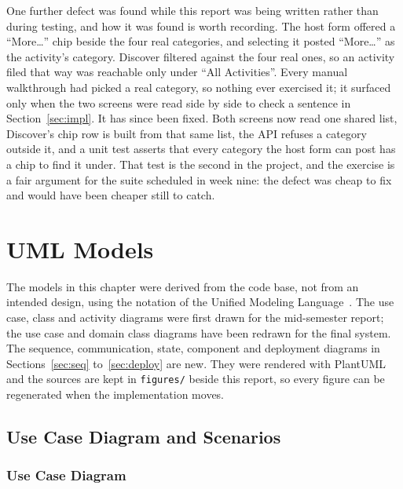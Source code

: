 \documentclass{tietreport}
\begin{document}
One further defect was found while this report was being written rather than during
testing, and how it was found is worth recording. The host form offered a
``More\ldots'' chip beside the four real categories, and selecting it posted
``More\ldots'' as the activity's category. Discover filtered against the four real
ones, so an activity filed that way was reachable only under ``All Activities''. Every
manual walkthrough had picked a real category, so nothing ever exercised it; it surfaced
only when the two screens were read side by side to check a sentence in
Section~\ref{sec:impl}. It has since been fixed. Both screens now read one shared list,
Discover's chip row is built from that same list, the API refuses a category outside it,
and a unit test asserts that every category the host form can post has a chip to find it
under. That test is the second in the project, and the exercise is a fair argument for
the suite scheduled in week nine: the defect was cheap to fix and would have been cheaper
still to catch.







\chapter{UML Models}
\label{ch:uml}

The models in this chapter were derived from the code base, not from an intended design,
using the notation of the Unified Modeling Language~\cite{booch2005,fowler2004}. The use
case, class and activity diagrams were first drawn for the mid-semester report; the use case
and domain class diagrams have been redrawn for the final system. The sequence,
communication, state, component and deployment diagrams in
Sections~\ref{sec:seq} to~\ref{sec:deploy} are new. They were rendered with
PlantUML~\cite{plantuml2026} and the sources are kept in \texttt{figures/} beside this
report, so every figure can be regenerated when the implementation moves.

\section{Use Case Diagram and Scenarios}

\subsection{Use Case Diagram}
\end{document}
